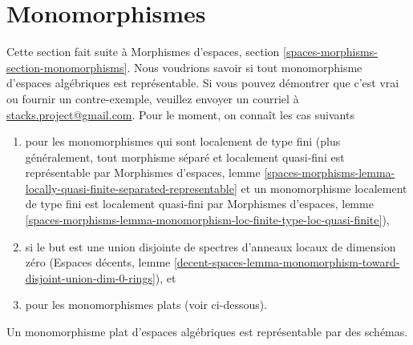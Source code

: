 \section{Monomorphismes}
\label{section-monomorphisms}

\noindent
Cette section fait suite à
Morphismes d'espaces, section \ref{spaces-morphisms-section-monomorphisms}.
Nous voudrions savoir si tout monomorphisme d'espaces algébriques est représentable.
Si vous pouvez démontrer que c'est vrai ou fournir un
contre-exemple, veuillez envoyer un courriel à
\href{mailto:stacks.project@gmail.com}{stacks.project@gmail.com}.
Pour le moment, on connaît les cas suivants
\begin{enumerate}
\item pour les monomorphismes qui sont localement de type fini
(plus généralement, tout morphisme séparé et localement quasi-fini
est représentable par Morphismes d'espaces, lemme
\ref{spaces-morphisms-lemma-locally-quasi-finite-separated-representable}
et un monomorphisme localement de type fini est
localement quasi-fini par Morphismes d'espaces, lemme
\ref{spaces-morphisms-lemma-monomorphism-loc-finite-type-loc-quasi-finite}),
\item si le but est une union disjointe de spectres d'anneaux locaux de dimension zéro
(Espaces décents, lemme
\ref{decent-spaces-lemma-monomorphism-toward-disjoint-union-dim-0-rings}), et
\item pour les monomorphismes plats (voir ci-dessous).
\end{enumerate}

\begin{lemma}
\label{lemma-flat-case}
Un monomorphisme plat d'espaces algébriques est représentable par des schémas.
\end{lemma}

